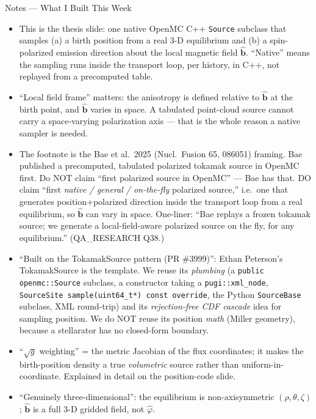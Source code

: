\documentclass[11pt,aspectratio=169]{beamer}
\newcommand{\bhat}{\hat{\mathbf{b}}}
\begin{document}
\begin{frame}[allowframebreaks]{Notes --- What I Built This Week}
{\color{red}\footnotesize
\begin{itemize}
\item This is the thesis slide: one native OpenMC C++ \texttt{Source} subclass that samples
      (a) a birth position from a real 3-D equilibrium and (b) a spin-polarized emission
      direction about the local magnetic field $\bhat$. ``Native'' means the sampling runs
      inside the transport loop, per history, in C++, not replayed from a precomputed table.
\item ``Local field frame'' matters: the anisotropy is defined relative to $\bhat$ at the
      birth point, and $\bhat$ varies in space. A tabulated point-cloud source cannot carry a
      space-varying polarization axis --- that is the whole reason a native sampler is needed.
\item The footnote is the Bae et al.\ 2025 (Nucl.\ Fusion 65, 086051) framing. Bae published a
      precomputed, tabulated polarized tokamak source in OpenMC first. Do NOT claim ``first
      polarized source in OpenMC'' --- Bae has that. DO claim ``first \emph{native / general /
      on-the-fly} polarized source,'' i.e.\ one that generates position+polarized direction
      inside the transport loop from a real equilibrium, so $\bhat$ can vary in space. One-liner:
      ``Bae replays a frozen tokamak source; we generate a local-field-aware polarized source on
      the fly, for any equilibrium.'' (QA\_RESEARCH Q38.)
\item ``Built on the TokamakSource pattern (PR \#3999)'': Ethan Peterson's TokamakSource is the
      template. We reuse its \emph{plumbing} (a \texttt{public openmc::Source} subclass, a
      constructor taking a \texttt{pugi::xml\_node}, \texttt{SourceSite sample(uint64\_t*) const
      override}, the Python \texttt{SourceBase} subclass, XML round-trip) and its
      \emph{rejection-free CDF cascade} idea for sampling position. We do NOT reuse its position
      \emph{math} (Miller geometry), because a stellarator has no closed-form boundary.
\item ``$\sqrt{g}$ weighting'' = the metric Jacobian of the flux coordinates; it makes the
      birth-position density a true \emph{volumetric} source rather than uniform-in-coordinate.
      Explained in detail on the position-code slide.
\item ``Genuinely three-dimensional'': the equilibrium is non-axisymmetric $(\rho,\theta,\zeta)$;
      $\bhat$ is a full 3-D gridded field, not $\hat\varphi$.

\end{itemize}}
\end{frame}
\end{document}
